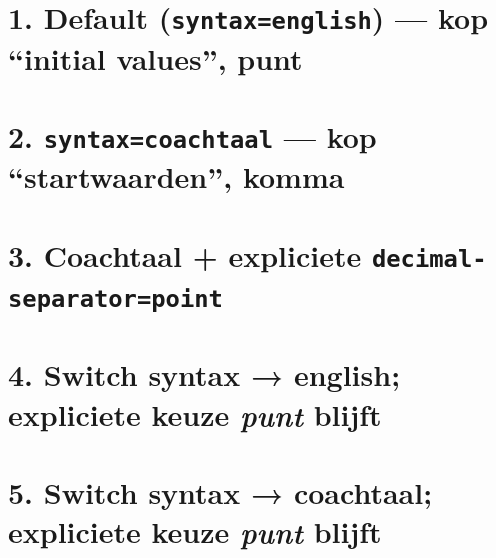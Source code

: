\documentclass{article}
\begin{document}

\section*{1. Default (\texttt{syntax=english}) — kop ``initial values'', punt}
\textmodel

\section*{2. \texttt{syntax=coachtaal} — kop ``startwaarden'', komma}
\textmodel

\section*{3. Coachtaal + expliciete \texttt{decimal-separator=point}}
\textmodel

\section*{4. Switch syntax → english; expliciete keuze \emph{punt} blijft}
\textmodel

\section*{5. Switch syntax → coachtaal; expliciete keuze \emph{punt} blijft}
\textmodel
\end{document}
